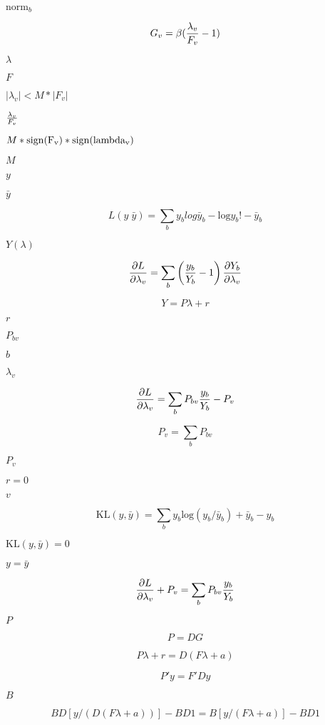 \documentclass{article}
\begin{document}
$\mathrm{norm}_b $
\pagebreak

\[ G_v = \beta ( {\lambda_v \over F_v} - 1) \]
\pagebreak

$ \lambda$
\pagebreak

$F$
\pagebreak

$|\lambda_v| < M*|F_v| $
\pagebreak

${\lambda_v \over F_v}$
\pagebreak

$M*\rm{sign}(F_v)*\rm{sign}(lambda_v)$
\pagebreak

$M$
\pagebreak

$y$
\pagebreak

$\bar y$
\pagebreak

\[ L(y\;\bar y) = \sum_b y_b log \bar y_b - \mathrm{log} y_b! - \bar y_b \]
\pagebreak

$Y(\lambda)$
\pagebreak

\[ {\partial L \over \partial \lambda_v} = \sum_b \left( {y_b \over Y_b} - 1 \right) {\partial Y_b \over \partial \lambda_v } \]
\pagebreak

\[ Y = P \lambda + r \]
\pagebreak

$r$
\pagebreak

$P_{bv}$
\pagebreak

$b$
\pagebreak

$\lambda_v$
\pagebreak

\[ {\partial L \over \partial \lambda_v} = \sum_b P_{bv} {y_b \over Y_b} - P_v \]
\pagebreak

\[ P_v = \sum_b P_{bv} \]
\pagebreak

$P_v$
\pagebreak

$r=0$
\pagebreak

$v$
\pagebreak

\[ \mathrm{KL}(y,\bar y) = \sum_b y_b \mathrm{log}(y_b/\bar y_b) + \bar y_b - y_b \]
\pagebreak

$\mathrm{KL}(y,\bar y)=0$
\pagebreak

$y=\bar y$
\pagebreak

\[ {\partial L \over \partial \lambda_v} + P_v = \sum_b P_{bv} {y_b \over Y_b} \]
\pagebreak

$P$
\pagebreak

\[ P = D G \]
\pagebreak

\[ P \lambda + r = D ( F \lambda + a ) \]
\pagebreak

\[ P' y = F' D y \]
\pagebreak

$B$
\pagebreak

\[ B D \left[ y / \left( D (F \lambda + a) \right) \right] - B D 1 = B \left[ y / \left(F \lambda + a \right) \right] - B D 1 \]
\pagebreak
\end{document}

